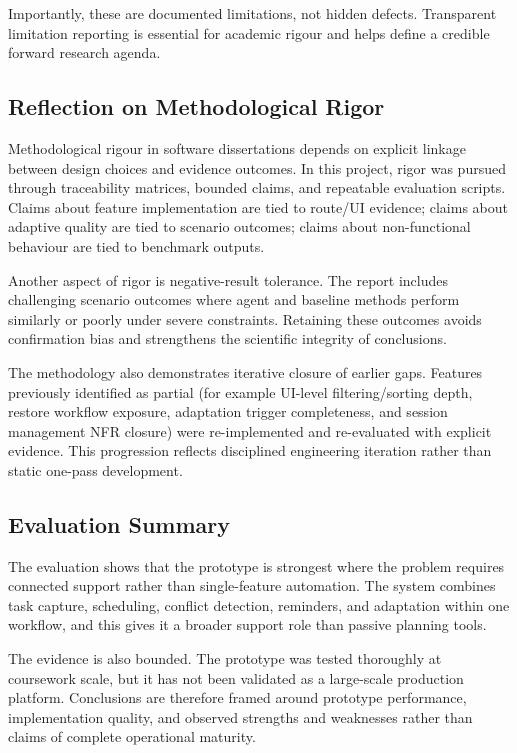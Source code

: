 \documentclass[12pt]{article}
\begin{document}
Importantly, these are documented limitations, not hidden defects. Transparent limitation reporting is essential for academic rigour and helps define a credible forward research agenda.

\subsection{Reflection on Methodological Rigor}
Methodological rigour in software dissertations depends on explicit linkage between design choices and evidence outcomes. In this project, rigor was pursued through traceability matrices, bounded claims, and repeatable evaluation scripts. Claims about feature implementation are tied to route/UI evidence; claims about adaptive quality are tied to scenario outcomes; claims about non-functional behaviour are tied to benchmark outputs.

Another aspect of rigor is negative-result tolerance. The report includes challenging scenario outcomes where agent and baseline methods perform similarly or poorly under severe constraints. Retaining these outcomes avoids confirmation bias and strengthens the scientific integrity of conclusions.

The methodology also demonstrates iterative closure of earlier gaps. Features previously identified as partial (for example UI-level filtering/sorting depth, restore workflow exposure, adaptation trigger completeness, and session management NFR closure) were re-implemented and re-evaluated with explicit evidence. This progression reflects disciplined engineering iteration rather than static one-pass development.

\subsection{Evaluation Summary}
The evaluation shows that the prototype is strongest where the problem requires connected support rather than single-feature automation. The system combines task capture, scheduling, conflict detection, reminders, and adaptation within one workflow, and this gives it a broader support role than passive planning tools.

The evidence is also bounded. The prototype was tested thoroughly at coursework scale, but it has not been validated as a large-scale production platform. Conclusions are therefore framed around prototype performance, implementation quality, and observed strengths and weaknesses rather than claims of complete operational maturity.
\end{document}
